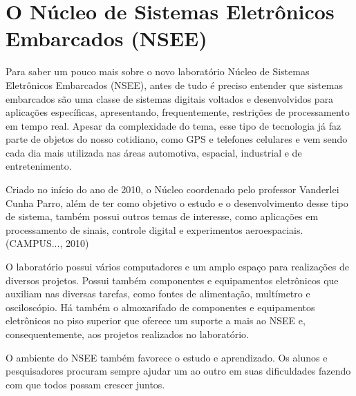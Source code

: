 
\section{O Núcleo de Sistemas Eletrônicos Embarcados (NSEE)}
Para saber um pouco mais sobre o novo laboratório Núcleo de Sistemas Eletrônicos Embarcados (NSEE), antes de tudo é preciso entender que sistemas embarcados são uma classe de sistemas digitais voltados e desenvolvidos para aplicações específicas, apresentando, frequentemente, restrições de processamento em tempo real. Apesar da complexidade do tema, esse tipo de tecnologia já faz parte de objetos do nosso cotidiano, como GPS e telefones celulares e vem sendo cada dia mais utilizada nas áreas automotiva, espacial, industrial e de entretenimento.

Criado no início do ano de 2010, o Núcleo coordenado pelo professor Vanderlei Cunha Parro, além de ter como objetivo o estudo e o desenvolvimento desse tipo de sistema, também possui outros temas de interesse, como aplicações em processamento de sinais, controle digital e experimentos aeroespaciais.(\uppercase{Campus...}, 2010) \let\thefootnote\relax{}

O laboratório possui vários computadores e um amplo espaço para realizações de diversos projetos. Possui também componentes e equipamentos eletrônicos que auxiliam nas diversas tarefas, como fontes de alimentação, multímetro e osciloscópio. Há também o almoxarifado de componentes e equipamentos eletrônicos no piso superior que oferece um suporte a mais ao NSEE e, consequentemente, aos projetos realizados no laboratório. 

O ambiente do NSEE também favorece o estudo e aprendizado. Os alunos e pesquisadores procuram sempre ajudar um ao outro em suas dificuldades fazendo com que todos possam crescer juntos.

